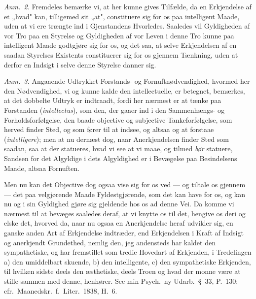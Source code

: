 \documentclass[12pt,a4paper]{book}
\newcommand{\apage}[1]{\marginnote{\footnotesize\textit{[#1]}}}
\begin{document}
{\small\emph{Anm.~2.} Fremdeles bemærke vi, at her kunne gives Tilfælde, da en
Erkjendelse af et „hvad" kan, tilligemed sit „at", constituere sig for os paa
intelligent Maade, uden at vi ere trængte ind i Gjenstandens Hvorledes. Saaledes
vil Gyldigheden af vor Tro paa en Styrelse og Gyldigheden af vor Leven i denne
Tro kunne paa intelligent Maade godtgjøre sig for os, og det saa, at selve
Erkjendelsen af en saadan Styrelses Existents constituerer sig for os gjennem
Tænkning, uden at derfor en Indsigt i selve denne Styrelse danner sig.\par}

{\small\emph{Anm.~3.} Angaaende Udtrykket Forstands- og Fornuftnødvendighed,
hvormed her den Nødvendighed, vi og kunne kalde den intellectuelle, er betegnet,
bemærkes, at det dobbelte Udtryk er indtraadt, fordi her nærmest er at tænke paa
Forstanden (\textit{intellectus}), som den, der gaaer ind i den Sammenhængs- og
Forholdsforfølgelse, den baade objective og subjective Tankeforfølgelse, som
herved finder Sted, og som fører til at indsee, og altsaa og at forstaae
(\textit{intelligere}); men at nu dernæst dog, naar Anerkjendelsen finder Sted
som saadan, saa at der statueres, hvad vi see at vi maae, og tilmed \emph{bør}
statuere, Sandsen for det Algyldige i dets Algyldighed er i Bevægelse paa
Besindelsens Maade, altsaa Fornuften.\par}

Men nu kan det Objective dog ogsaa vise sig for os ved --- og tiltale os gjennem
--- det paa velgjørende Maade Fyldestgjørende, som det kan have for os, og kan nu
og i sin Gyldighed gjøre sig gjeldende hos os ad denne Vei. Da komme vi nærmest
til at bevæges saaledes deraf, at vi knytte os til det, hengive os deri og elske
det, hvorved da, naar nu ogsaa en Anerkjendelse heraf udvikler sig, en ganske
anden Art af Erkjendelse indtræder, end Erkjendelsen i Kraft af Indsigt og
anerkjendt Grundethed, nemlig den, jeg andensteds har kaldet den sympathetiske,
og har fremstillet som tredie Hovedart af Erkjenden, i Tredelingen a) den
umiddelbart skuende, b) den intelligente, c) den sympathetiske Erkjenden, til
hvilken sidste deels den æsthetiske, deels Troen og hvad der monne være at  \apage{18} stille
sammen med denne, henhører. See min Psych.\ ny Udarb.\ \S~33, P.\ 130;
cfr.\ Maanedskr.\ f.\ Liter.\ 1838, H.\ 6.
\end{document}
